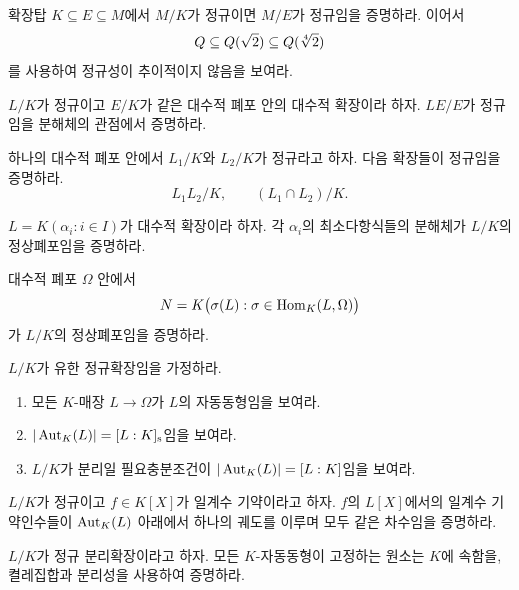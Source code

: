 \begin{exercise}[*]
확장탑 $K\subseteq E\subseteq M$에서 $M/K$가 정규이면 $M/E$가 정규임을 증명하라. 이어서
\[
  Q\subseteq Q(\sqrt2)\subseteq Q(\sqrt[4]{2})
\]
를 사용하여 정규성이 추이적이지 않음을 보여라.
\end{exercise}

\begin{exercise}
$L/K$가 정규이고 $E/K$가 같은 대수적 폐포 안의 대수적 확장이라 하자. $LE/E$가 정규임을 분해체의 관점에서 증명하라.
\end{exercise}

\begin{exercise}[*]
하나의 대수적 폐포 안에서 $L_1/K$와 $L_2/K$가 정규라고 하자. 다음 확장들이 정규임을 증명하라.
\[
  L_1L_2/K,
  \qquad
  (L_1\cap L_2)/K.
\]
\end{exercise}

\begin{exercise}
$L=K(\alpha_i:i\in I)$가 대수적 확장이라 하자. 각 $\alpha_i$의 최소다항식들의 분해체가 $L/K$의 정상폐포임을 증명하라.
\end{exercise}

\begin{exercise}
대수적 폐포 $\Omega$ 안에서
\[
  N=K\bigl(\sigma(L):\sigma\in\operatorname{Hom}_K(L,\Omega)\bigr)
\]
가 $L/K$의 정상폐포임을 증명하라.
\end{exercise}

\begin{exercise}[*]
$L/K$가 유한 정규확장임을 가정하라.
\begin{enumerate}[label=(\alph*)]
  \item 모든 $K$-매장 $L\to\Omega$가 $L$의 자동동형임을 보여라.
  \item $|\operatorname{Aut}_K(L)|=[L:K]_{\mathrm s}$임을 보여라.
  \item $L/K$가 분리일 필요충분조건이 $|\operatorname{Aut}_K(L)|=[L:K]$임을 보여라.
\end{enumerate}
\end{exercise}

\begin{exercise}
$L/K$가 정규이고 $f\in K[X]$가 일계수 기약이라고 하자. $f$의 $L[X]$에서의 일계수 기약인수들이 $\operatorname{Aut}_K(L)$ 아래에서 하나의 궤도를 이루며 모두 같은 차수임을 증명하라.
\end{exercise}

\begin{exercise}
$L/K$가 정규 분리확장이라고 하자. 모든 $K$-자동동형이 고정하는 원소는 $K$에 속함을, 켤레집합과 분리성을 사용하여 증명하라.
\end{exercise}

